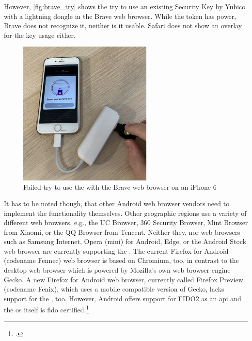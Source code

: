 However, \autoref{fig:brave_try} shows the try to use an existing Security Key by Yubico with a lightning dongle in the Brave web browser. While the token has power, Brave does not recognize it, neither is it usable. Safari does not show an overlay for the key usage either.

\newpage

\begin{figure}[hbt]
	\centering
	\includegraphics[width=0.6\textwidth]{pics/brave_try_dongle.eps}
	\caption[Failed try to use the \wa{} with the Brave web browser on an iPhone 6]{Failed try to use the \wa{} with the Brave web browser on an iPhone 6\footnotemark}
	\label{fig:brave_try}
\end{figure}

It has to be noted though, that other Android web browser vendors need to implement the functionality themselves. Other geographic regions use a variety of different web browsers, e.g., the UC Browser, 360 Security Browser, Mint Browser from Xiaomi, or the QQ Browser from Tencent. Neither they, nor web browsers such as Samsung Internet, Opera (mini) for Android, Edge, or the Android Stock web browser are currently supporting the \wa. The current Firefox for Android (codename \frqq Fennec\flqq) web browser is based on Chromium, too, in contrast to the desktop web browser which is powered by Mozilla's own web browser engine Gecko. A new Firefox for Android web browser, currently called Firefox Preview (codename \frqq Fenix\flqq), which uses a mobile compatible version of Gecko, lacks support for the \wa, too. However, Android offers support for FIDO2 as an \gls{api} and the \gls{os} itself is \gls{fido} certified.\footcites[See][24]{fido-ct-3}

